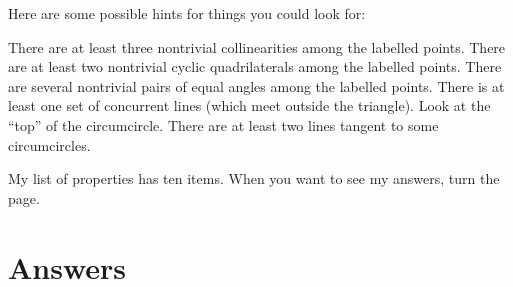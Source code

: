 \documentclass[11pt]{scrartcl}
\begin{document}
Here are some possible hints for things you could look for:
\begin{itemize}
  \ii There are at least three nontrivial collinearities among the labelled points.
  \ii There are at least two nontrivial cyclic quadrilaterals among the labelled points.
  \ii There are several nontrivial pairs of equal angles among the labelled points.
  \ii There is at least one set of concurrent lines (which meet outside the triangle).
  \ii Look at the ``top'' of the circumcircle.
  \ii There are at least two lines tangent to some circumcircles.
\end{itemize}

My list of properties has ten items.
When you want to see my answers, turn the page.

\eject

\section{Answers}
\end{document}
